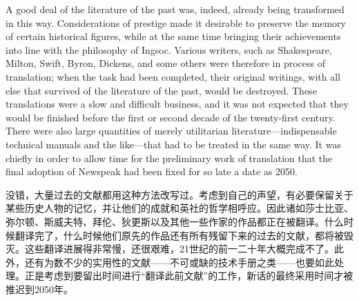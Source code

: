 \begin{paracol}{2}
A good deal of the literature of the past was, indeed, already being
transformed in this way. Considerations of prestige made it desirable to
preserve the memory of certain historical figures, while at the same
time bringing their achievements into line with the philosophy of
Ingsoc. Various writers, such as Shakespeare, Milton, Swift, Byron,
Dickens, and some others were therefore in process of translation; when
the task had been completed, their original writings, with all else that
survived of the literature of the past, would be destroyed. These
translations were a slow and difficult business, and it was not expected
that they would be finished before the first or second decade of the
twenty-first century. There were also large quantities of merely
utilitarian literature---indispensable technical manuals and the
like---that had to be treated in the same way. It was chiefly in order
to allow time for the preliminary work of translation that the final
adoption of Newspeak had been fixed for so late a date as 2050.


\switchcolumn

没错，大量过去的文献都用这种方法改写过。考虑到自己的声望，有必要保留关于某些历史人物的记忆，并让他们的成就和英社的哲学相呼应。因此诸如莎士比亚、弥尔顿、斯威夫特、拜伦、狄更斯以及其他一些作家的作品都正在被翻译。什么时候翻译完了，什么时候他们原先的作品还有所有残留下来的过去的文献，都将被毁灭。这些翻译进展得非常慢，还很艰难，21世纪的前一二十年大概完成不了。此外，还有为数不少的实用性的文献——不可或缺的技术手册之类——也要如此处理。正是考虑到要留出时间进行``翻译此前文献''的工作，新话的最终采用时间才被推迟到2050年。


\switchcolumn*

\end{paracol}
